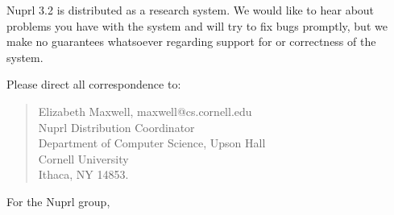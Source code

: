 \begin{letter}{\hspace{0in}}
Nuprl 3.2 is distributed as a research system.  We would like to hear
about problems you have with the system and will try to fix bugs
promptly, but we make no guarantees whatsoever regarding support for
or correctness of the system.

Please direct all correspondence to:
\begin{verse}
Elizabeth Maxwell, maxwell@cs.cornell.edu\\
Nuprl Distribution Coordinator\\
Department of Computer Science, Upson Hall\\
Cornell University\\
Ithaca, NY 14853. 
\end{verse}


\closing
{
For the Nuprl group,
}


\end{letter}




